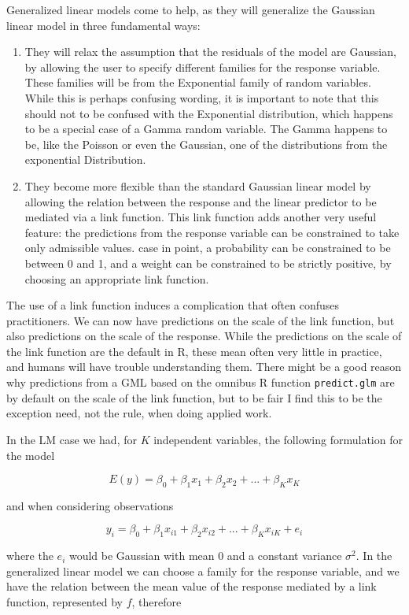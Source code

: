\documentclass[
]{book}
\begin{document}
Generalized linear models come to help, as they will generalize the Gaussian linear model in three fundamental ways:

\begin{enumerate}
\def\labelenumi{\arabic{enumi}.}
\item
  They will relax the assumption that the residuals of the model are Gaussian, by allowing the user to specify different families for the response variable. These families will be from the Exponential family of random variables. While this is perhaps confusing wording, it is important to note that this should not to be confused with the Exponential distribution, which happens to be a special case of a Gamma random variable. The Gamma happens to be, like the Poisson or even the Gaussian, one of the distributions from the exponential Distribution.
\item
  They become more flexible than the standard Gaussian linear model by allowing the relation between the response and the linear predictor to be mediated via a link function. This link function adds another very useful feature: the predictions from the response variable can be constrained to take only admissible values. case in point, a probability can be constrained to be between 0 and 1, and a weight can be constrained to be strictly positive, by choosing an appropriate link function.
\end{enumerate}

The use of a link function induces a complication that often confuses practitioners. We can now have predictions on the scale of the link function, but also predictions on the scale of the response. While the predictions on the scale of the link function are the default in R, these mean often very little in practice, and humans will have trouble understanding them. There might be a good reason why predictions from a GML based on the omnibus R function \texttt{predict.glm} are by default on the scale of the link function, but to be fair I find this to be the exception need, not the rule, when doing applied work.

In the LM case we had, for \(K\) independent variables, the following formulation for the model

\[E(y)=\beta_0+\beta_1x_1+\beta_2x_2+...+\beta_Kx_K\]

and when considering observations

\[y_i=\beta_0+\beta_1x_{i1}+\beta_2x_{i2}+...+\beta_Kx_{iK}+e_i\]

where the \(e_i\) would be Gaussian with mean 0 and a constant variance \(\sigma^2\). In the generalized linear model we can choose a family for the response variable, and we have the relation between the mean value of the response mediated by a link function, represented by \(f\), therefore
\end{document}
